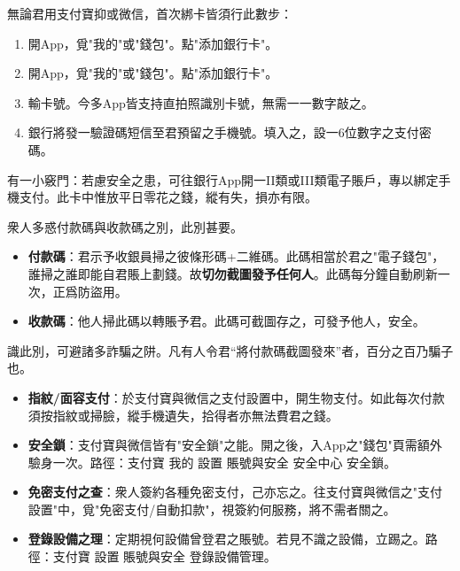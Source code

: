 


無論君用支付寶抑或微信，首次綁卡皆須行此數步：

\begin{enumerate}
  \item 開App，覓"我的"或"錢包"。點"添加銀行卡"。
  \item 開App，覓"我的"或"錢包"。點"添加銀行卡"。
  \item 輸卡號。今多App皆支持直拍照識別卡號，無需一一數字敲之。
  \item 銀行將發一驗證碼短信至君預留之手機號。填入之，設一6位數字之支付密碼。
\end{enumerate}

有一小竅門：若慮安全之患，可往銀行App開一II類或III類電子賬戶，專以綁定手機支付。此卡中惟放平日零花之錢，縱有失，損亦有限。


衆人多惑付款碼與收款碼之別，此別甚要。

\begin{itemize}
  \item \textbf{付款碼}：君示予收銀員掃之彼條形碼+二維碼。此碼相當於君之"電子錢包"，誰掃之誰即能自君賬上劃錢。故\textbf{切勿截圖發予任何人}。此碼每分鐘自動刷新一次，正爲防盜用。
  \item \textbf{收款碼}：他人掃此碼以轉賬予君。此碼可截圖存之，可發予他人，安全。
\end{itemize}

識此別，可避諸多詐騙之阱。凡有人令君“將付款碼截圖發來”者，百分之百乃騙子也。


\begin{itemize}
  \item \textbf{指紋/面容支付}：於支付寶與微信之支付設置中，開生物支付。如此每次付款須按指紋或掃臉，縱手機遺失，拾得者亦無法費君之錢。
  \item \textbf{安全鎖}：支付寶與微信皆有"安全鎖"之能。開之後，入App之"錢包"頁需額外驗身一次。路徑：支付寶 我的 設置 賬號與安全 安全中心 安全鎖。
  \item \textbf{免密支付之查}：衆人簽約各種免密支付，己亦忘之。往支付寶與微信之"支付設置"中，覓"免密支付/自動扣款"，視簽約何服務，將不需者關之。
  \item \textbf{登錄設備之理}：定期視何設備曾登君之賬號。若見不識之設備，立踢之。路徑：支付寶 設置 賬號與安全 登錄設備管理。
\end{itemize}

